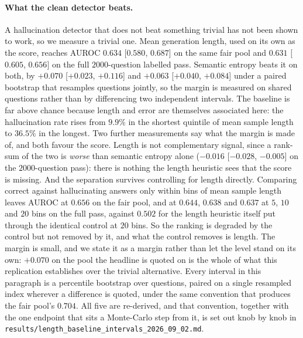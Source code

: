 \paragraph{What the clean detector beats.}
A hallucination detector that does not beat something trivial has not been shown to work, so
we measure a trivial one. Mean generation length, used on its own as the score, reaches
AUROC $0.634$ [$0.580$, $0.687$] on the same fair pool and $0.631$ [$0.605$, $0.656$] on the
full $2000$-question labelled pass. Semantic entropy beats it on both, by $+0.070$
[$+0.023$, $+0.116$] and $+0.063$ [$+0.040$, $+0.084$] under a paired bootstrap that
resamples questions jointly, so the margin is measured on shared questions rather than by
differencing two independent intervals. The baseline is far above chance because length and
error are themselves associated here: the hallucination rate rises from $9.9\%$ in the
shortest quintile of mean sample length to $36.5\%$ in the longest. Two further measurements
say what the margin is made of, and both favour the score. Length is not complementary
signal, since a rank-sum of the two is \emph{worse} than semantic entropy alone
($-0.016$ [$-0.028$, $-0.005$] on the $2000$-question pass): there is nothing the length
heuristic sees that the score is missing. And the separation survives controlling for length
directly. Comparing correct against hallucinating answers only within bins of mean sample
length leaves AUROC at $0.656$ on the fair pool, and at $0.644$, $0.638$ and $0.637$ at
$5$, $10$ and $20$ bins on the full pass, against $0.502$ for the length heuristic itself put
through the identical control at $20$ bins. So the ranking is degraded by the control but not
removed by it, and what the control removes is length. The margin is small, and we state it
as a margin rather than let the level stand on its own: $+0.070$ on the pool the headline is
quoted on is the whole of what this replication establishes over the trivial alternative.
Every interval in this paragraph is a percentile bootstrap over questions, paired on a single
resampled index wherever a difference is quoted, under the same convention that produces the
fair pool's $0.704$. All five are re-derived, and that convention, together with the one
endpoint that sits a Monte-Carlo step from it, is set out knob by knob in
\texttt{results/length\_baseline\_intervals\_2026\_09\_02.md}.

